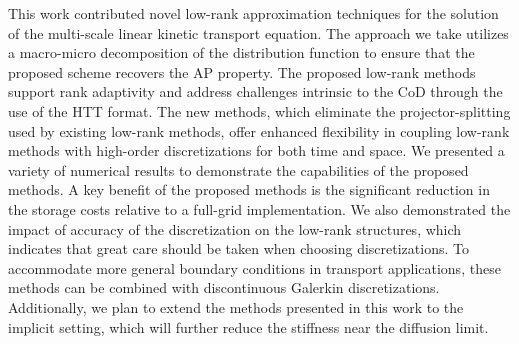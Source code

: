 \documentclass[onefignum,onetabnum]{siamart220329}
\begin{document}
This work contributed novel low-rank approximation techniques for the solution of the multi-scale linear kinetic transport equation. The approach we take utilizes a macro-micro decomposition of the distribution function to ensure that the proposed scheme recovers the AP property. The proposed low-rank methods support rank adaptivity and address challenges intrinsic to the CoD through the use of the HTT format. The new methods, which eliminate the projector-splitting used by existing low-rank methods, offer enhanced flexibility in coupling low-rank methods with high-order discretizations for both time and space. We presented a variety of numerical results to demonstrate the capabilities of the proposed methods. A key benefit of the proposed methods is the significant reduction in the storage costs relative to a full-grid implementation. We also demonstrated the impact of accuracy of the discretization on the low-rank structures, which indicates that great care should be taken when choosing discretizations. To accommodate more general boundary conditions in transport applications, these methods can be combined with discontinuous Galerkin discretizations. Additionally, we plan to extend the methods presented in this work to the implicit setting, which will further reduce the stiffness near the diffusion limit. 





\end{document}

